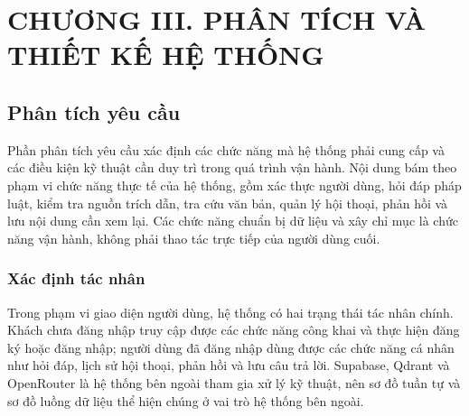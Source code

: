 \documentclass[12pt,a4paper,oneside]{report}
\begin{document}
\clearpage
\setcounter{chapter}{3}
\setcounter{section}{0}
\setcounter{subsection}{0}
\setcounter{figure}{0}
\setcounter{table}{0}
\chapter*{CHƯƠNG III. PHÂN TÍCH VÀ THIẾT KẾ HỆ THỐNG}

\section{Phân tích yêu cầu}
Phần phân tích yêu cầu xác định các chức năng mà hệ thống phải cung cấp và các điều kiện kỹ thuật cần duy trì trong quá trình vận hành. Nội dung bám theo phạm vi chức năng thực tế của hệ thống, gồm xác thực người dùng, hỏi đáp pháp luật, kiểm tra nguồn trích dẫn, tra cứu văn bản, quản lý hội thoại, phản hồi và lưu nội dung cần xem lại. Các chức năng chuẩn bị dữ liệu và xây chỉ mục là chức năng vận hành, không phải thao tác trực tiếp của người dùng cuối.

\subsection{Xác định tác nhân}
Trong phạm vi giao diện người dùng, hệ thống có hai trạng thái tác nhân chính. Khách chưa đăng nhập truy cập được các chức năng công khai và thực hiện đăng ký hoặc đăng nhập; người dùng đã đăng nhập dùng được các chức năng cá nhân như hỏi đáp, lịch sử hội thoại, phản hồi và lưu câu trả lời. Supabase, Qdrant và OpenRouter là hệ thống bên ngoài tham gia xử lý kỹ thuật, nên sơ đồ tuần tự và sơ đồ luồng dữ liệu thể hiện chúng ở vai trò hệ thống bên ngoài.
\end{document}
